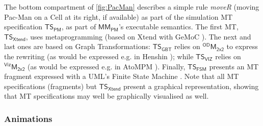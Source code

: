 The bottom compartment of \autoref{fig:PacMan} describes a simple rule 
\emph{\textsf{moveR}} (moving Pac-Man on a \textsf{Cell} at its right, if 
available) as part of the simulation MT specification $\mathsf{TS}_{\mathsf{PM}}$,
as part of $\mathsf{MM}_{\mathsf{PM}}$'s executable semantics. 
The first MT, $\mathsf{TS}_{\mathsf{Xtend}}$, uses metaprogramming 
(based on Xtend with GeMoC \cite{Leroy-Bousse-etAl:2017}). The next and last ones
are based on Graph Transformations: $\mathsf{TS}_{\mathsf{GBT}}$ relies on 
$^{\mathsf{OD}}\mathsf{M}_{\mathsf{2x2}}$ to express the rewriting (as would be 
expressed e.g. in Henshin \cite{Bill-Gabmeyer-Kaufmann-Seidl:2014}); 
while $\mathsf{TS}_{\mathsf{VIZ}}$ relies on $^{\mathsf{Viz}}\mathsf{M}_{\mathsf{2x2}}$
(as would be expressed e.g. in AtoMPM \cite{J:SyrianiVangheluwe:2013}). 
Finally, $\mathsf{TS}_{\mathsf{FSM}}$ presents an MT fragment expressed with 
a UML's Finite State Machine \cite{B:Rumbaugh-Jacobson-Booch:2004}. 
Note that all MT specifications (fragments) but $\mathsf{TS}_{\mathsf{Xtend}}$ 
present a graphical representation, showing that MT specifications may well be 
graphically visualised as well.

\subsubsection{Animations}
\label{sec:Examples:PacMan:Animations}

